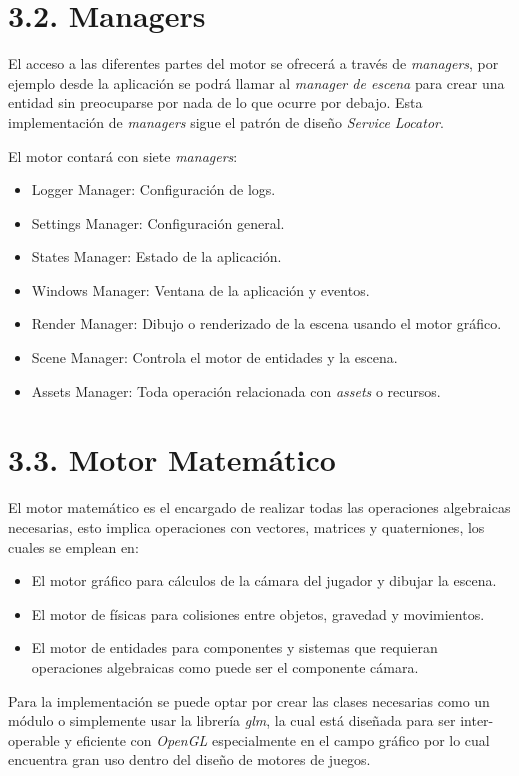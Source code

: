 

\section*{3.2. Managers}\label{sec:managers}

El acceso a las diferentes partes del motor se ofrecerá a través de \textit{managers}, por ejemplo desde
la aplicación se podrá llamar al \textit{manager de escena} para crear una entidad sin preocuparse por nada
de lo que ocurre por debajo. Esta implementación de \textit{managers} sigue el patrón de diseño \textit{Service Locator}\cite{service-locator-pattern}.

El motor contará con siete \textit{managers}:
\begin{itemize}
    \item Logger Manager: Configuración de logs.
    \item Settings Manager: Configuración general.
    \item States Manager: Estado de la aplicación.
    \item Windows Manager: Ventana de la aplicación y eventos.
    \item Render Manager: Dibujo o renderizado de la escena usando el motor gráfico.
    \item Scene Manager: Controla el motor de entidades y la escena.
    \item Assets Manager: Toda operación relacionada con \textit{assets} o recursos.
\end{itemize}

\section*{3.3. Motor Matemático}\label{sec:math_engine}

El motor matemático es el encargado de realizar todas las operaciones algebraicas necesarias, esto implica operaciones con
vectores, matrices y quaterniones, los cuales se emplean en:
\begin{itemize}
    \item El motor gráfico para cálculos de la cámara del jugador y dibujar la escena.
    \item El motor de físicas para colisiones entre objetos, gravedad y movimientos.
    \item El motor de entidades para componentes y sistemas que requieran operaciones algebraicas como puede ser el componente cámara.
\end{itemize}
Para la implementación se puede optar por crear las clases necesarias como un módulo o simplemente usar la librería
\textit{glm}\cite{glm}, la cual está diseñada para ser inter-operable y eficiente con \textit{OpenGL}\cite{opengl} especialmente en el campo gráfico por lo cual
encuentra gran uso dentro del diseño de motores de juegos.

